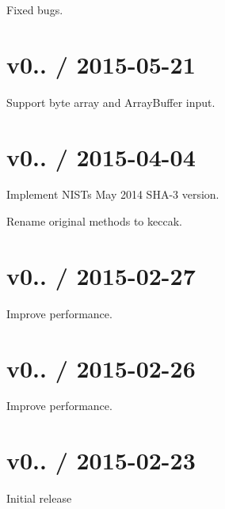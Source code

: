 
\begin{DoxyItemize}
\item Fixed bugs.
\end{DoxyItemize}

\section*{v0.. / 2015-\/05-\/21}


\begin{DoxyItemize}
\item Support byte array and Array\+Buffer input.
\end{DoxyItemize}

\section*{v0.. / 2015-\/04-\/04}


\begin{DoxyItemize}
\item Implement N\+I\+ST\textquotesingle{}s May 2014 S\+H\+A-\/3 version.
\item Rename original methods to keccak.
\end{DoxyItemize}

\section*{v0.. / 2015-\/02-\/27}


\begin{DoxyItemize}
\item Improve performance.
\end{DoxyItemize}

\section*{v0.. / 2015-\/02-\/26}


\begin{DoxyItemize}
\item Improve performance.
\end{DoxyItemize}

\section*{v0.. / 2015-\/02-\/23}


\begin{DoxyItemize}
\item Initial release 
\end{DoxyItemize}